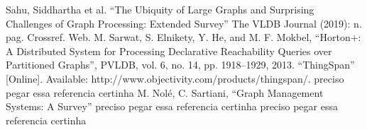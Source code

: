 \documentclass[conference]{IEEEtran}
\begin{document}
\begin{thebibliography}{00}
 Sahu, Siddhartha et al. ``The Ubiquity of Large Graphs and Surprising Challenges of Graph Processing: Extended Survey'' The VLDB Journal (2019): n. pag. Crossref. Web.
 M. Sarwat, S. Elnikety, Y. He, and M. F. Mokbel, ``Horton+: A Distributed System for Processing Declarative Reachability Queries over Partitioned Graphs'', PVLDB, vol. 6, no. 14, pp. 1918–1929, 2013.
 ``ThingSpan'' [Online]. Available: http://www.objectivity.com/products/thingspan/.
 {\color{red} preciso pegar essa referencia certinha} M. Nolé, C. Sartiani, ``Graph Management Systems: A Survey''
 {\color{red} preciso pegar essa referencia certinha}
 {\color{red} preciso pegar essa referencia certinha}
\end{thebibliography}
\end{document}
